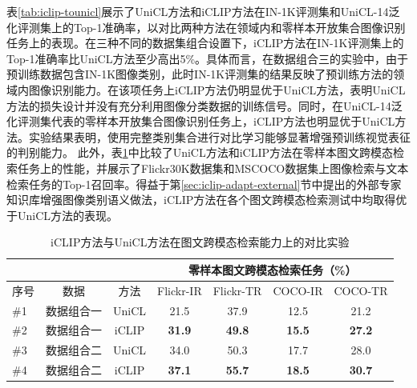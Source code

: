 表\ref{tab:iclip-tounicl}展示了UniCL方法和iCLIP方法在IN-1K评测集和UniCL-14泛化评测集上的Top-1准确率，以对比两种方法在领域内和零样本开放集合图像识别任务上的表现。在三种不同的数据集组合设置下，iCLIP方法在IN-1K评测集上的Top-1准确率比UniCL方法至少高出5\%。具体而言，在数据组合三的实验中，由于预训练数据包含IN-1K图像类别，此时IN-1K评测集的结果反映了预训练方法的领域内图像识别能力。在该项任务上iCLIP方法仍明显优于UniCL方法，表明UniCL方法的损失设计并没有充分利用图像分类数据的训练信号。同时，在UniCL-14泛化评测集代表的零样本开放集合图像识别任务上，iCLIP方法也明显优于UniCL方法。实验结果表明，使用完整类别集合进行对比学习能够显著增强预训练视觉表征的判别能力。
此外，表\ref{tab:iclip-tounicl-ret}中比较了UniCL方法和iCLIP方法在零样本图文跨模态检索任务上的性能，并展示了Flickr30K数据集和MSCOCO数据集上图像检索与文本检索任务的Top-1召回率。得益于第\ref{sec:iclip-adapt-external}节中提出的外部专家知识库增强图像类别语义做法，iCLIP方法在各个图文跨模态检索测试中均取得优于UniCL方法的表现。



\begin{table}
    \centering
    \caption{iCLIP方法与UniCL方法在图文跨模态检索能力上的对比实验}
    \begin{tabular}{lcccccc}
    \toprule
        \multicolumn{1}{c}{} &
        \multicolumn{1}{c}{} & \multicolumn{1}{c}{} & \multicolumn{4}{c}{零样本图文跨模态检索任务（\%）} \\
        \midrule
        序号 & 数据 & 方法 & Flickr-IR & Flickr-TR & COCO-IR & COCO-TR    \\
        \midrule
        \#1 & 数据组合一 & UniCL & 21.5 & 37.9 & 12.5 & 21.2 \\  
        \#2 & 数据组合一 & iCLIP & \textbf{31.9} & \textbf{49.8} & \textbf{15.5} & \textbf{27.2} \\  

        \midrule
        
        \#3 & 数据组合二 & UniCL & 34.0 & 50.3 & 17.7 & 28.0 \\
        \#4 & 数据组合二 & iCLIP & \textbf{37.1} & \textbf{55.7} & \textbf{18.5} & \textbf{30.7}\\   
        
        \bottomrule
    \end{tabular}

    \label{tab:iclip-tounicl-ret}
\end{table}


